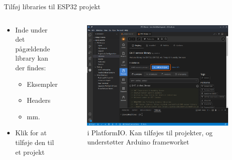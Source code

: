 \documentclass[aspectratio=169]{beamer}
\begin{document}
\begin{frame}{Tilføj libraries til ESP32 projekt}
\begin{columns}
	\begin{column}{0.5\textwidth}
		\begin{textBox}
			\begin{itemize}
				\item Inde under det pågældende library kan der findes:
				\begin{itemize}
					\item Eksempler
					\item Headers
					\item mm.
				\end{itemize}
				\item Klik  for at tilføje den til et projekt
			\end{itemize}
		\end{textBox}
	\end{column}
	\begin{column}{0.5\textwidth}
		\begin{figure}
  			\includegraphics[width=\textwidth,keepaspectratio=true]{assets/pictures/pio-libraries-2.png}
  			\caption{ i PlatformIO. Kan tilføjes til projekter, og understøtter Arduino frameworket}
  			\label{fig:pio-libraries-2}
		\end{figure}
	\end{column}
\end{columns}
\end{frame}
\end{document}
